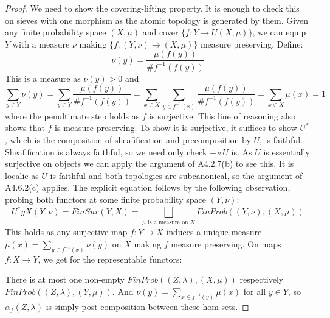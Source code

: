 \documentclass[a4paper]{amsproc}
\theoremstyle{plain}
\theoremstyle{definition}
\theoremstyle{remark}
\numberwithin{equation}{section}
\begin{document}
\begin{proof} We need to show the covering-lifting property. It is enough to check this on sieves with one morphism as the atomic topology is generated by them. Given any finite probability space $(X,\mu)$ and cover $\{f: Y\rightarrow U(X,\mu) \}$, we can equip $Y$ with a measure $\nu$ making $\{f: (Y,\nu)\rightarrow (X,\mu) \}$ measure preserving. Define:
\[\nu(y)=\frac{\mu(f(y))}{\# f^{-1}(f(y))} \]
This is a measure as $\nu(y)>0$ and
\[  \sum_{y\in Y}\nu(y)=\sum_{y\in Y}\frac{\mu(f(y))}{\# f^{-1}(f(y))}=\sum_{x\in X}\sum_{y\in f^{-1}(x)}\frac{\mu(f(y))}{\# f^{-1}(f(y))} =\sum_{x\in X}\mu(x)=1\]
where the penultimate step holds as $f$ is surjective. This line of reasoning also shows that $f$ is measure preserving. 
\newline \indent To show it is surjective, it suffices to show $U^*$, which is the composition of sheafification and precomposition by $U$, is faithful. Sheafification is always faithful, so we need only check $-\circ U$ is. As $U$ is essentially surjective on objects we can apply the argument of A4.2.7(b) \cite{elephant} to see this.
\newline \indent It is localic as $U$ is faithful and both topologies are subcanonical, so the argument of A4.6.2(c) \cite{elephant} applies.
\newline\indent The explicit equation follows by the following observation, probing both functors at some finite probability space $(Y,\nu)$:
\[U^*yX(Y,\nu)=FinSur(Y,X)=\bigsqcup_{\mu\text{ is a measure on }X}FinProb((Y,\nu),(X,\mu))\]
This holds as any surjective map $f:Y\rightarrow X$ induces a unique measure $\mu(x)=\sum_{y\in f^{-1}(x)} \nu(y)$ on $X$ making $f$ measure preserving. On maps $f:X\rightarrow Y$, we get for the representable functors:
\begin{center}
\end{center}
There is at most one non-empty $FinProb((Z,\lambda),(X,\mu))$ respectively \linebreak $FinProb((Z,\lambda),(Y,\mu))$. And $\nu(y)=\sum_{x\in f^{-1}(y)} \mu(x)$ for all $y\in Y$, so  $\alpha_f (Z{,} \lambda)$ is simply post composition between these hom-sets.
\end{proof}%
\end{document}
